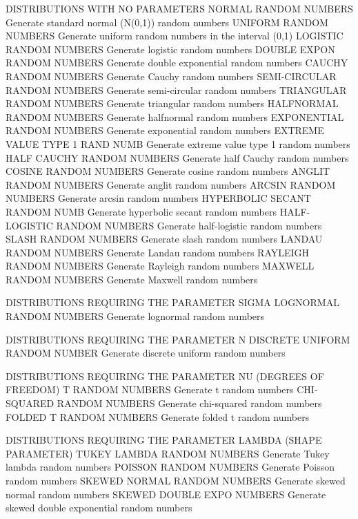 DISTRIBUTIONS WITH NO PARAMETERS
   NORMAL RANDOM NUMBERS          Generate standard normal (N(0,1))
                                  random numbers
   UNIFORM RANDOM NUMBERS         Generate uniform random numbers in
                                  the interval (0,1)
   LOGISTIC RANDOM NUMBERS        Generate logistic random numbers
   DOUBLE EXPON RANDOM NUMBERS    Generate double exponential random
                                  numbers
   CAUCHY RANDOM NUMBERS          Generate Cauchy random numbers
   SEMI-CIRCULAR RANDOM NUMBERS   Generate semi-circular random numbers
   TRIANGULAR RANDOM NUMBERS      Generate triangular random numbers
   HALFNORMAL RANDOM NUMBERS      Generate halfnormal random numbers
   EXPONENTIAL RANDOM NUMBERS     Generate exponential random numbers
   EXTREME VALUE TYPE 1 RAND NUMB Generate extreme value type 1 random
                                  numbers
   HALF CAUCHY RANDOM NUMBERS     Generate half Cauchy random numbers
   COSINE RANDOM NUMBERS          Generate cosine random numbers
   ANGLIT RANDOM NUMBERS          Generate anglit random numbers
   ARCSIN RANDOM NUMBERS          Generate arcsin random numbers
   HYPERBOLIC SECANT RANDOM NUMB  Generate hyperbolic secant random
                                  numbers
   HALF-LOGISTIC RANDOM NUMBERS   Generate half-logistic random
                                  numbers
   SLASH RANDOM NUMBERS           Generate slash random numbers
   LANDAU RANDOM NUMBERS          Generate Landau random numbers
   RAYLEIGH RANDOM NUMBERS        Generate Rayleigh random numbers
   MAXWELL RANDOM NUMBERS         Generate Maxwell random numbers
 
DISTRIBUTIONS REQUIRING THE PARAMETER SIGMA
   LOGNORMAL RANDOM NUMBERS       Generate lognormal random numbers

DISTRIBUTIONS REQUIRING THE PARAMETER N
   DISCRETE UNIFORM RANDOM NUMBER Generate discrete uniform random
                                  numbers
 
DISTRIBUTIONS REQUIRING THE PARAMETER NU (DEGREES OF FREEDOM)
   T RANDOM NUMBERS               Generate t random numbers
   CHI-SQUARED RANDOM NUMBERS     Generate chi-squared random numbers
   FOLDED T RANDOM NUMBERS        Generate folded t random numbers
 
DISTRIBUTIONS REQUIRING THE PARAMETER LAMBDA (SHAPE PARAMETER)
   TUKEY LAMBDA RANDOM NUMBERS    Generate Tukey lambda random numbers
   POISSON RANDOM NUMBERS         Generate Poisson random numbers
   SKEWED NORMAL RANDOM NUMBERS   Generate skewed normal random
                                  numbers
   SKEWED DOUBLE EXPO NUMBERS     Generate skewed double exponential
                                  random numbers


